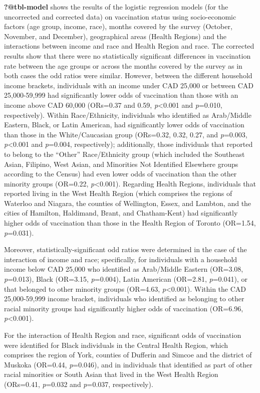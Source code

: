 \documentclass[
  letterpaper,
  DIV=11,
  numbers=noendperiod]{scrartcl}
\begin{document}
\textbf{?@tbl-model} shows the results of the logistic regression models
(for the uncorrected and corrected data) on vaccination status using
socio-economic factors (age group, income, race), months covered by the
survey (October, November, and December), geographical areas (Health
Regions) and the interactions between income and race and Health Region
and race. The corrected results show that there were no statistically
significant differences in vaccination rate between the age groups or
across the months covered by the survey as in both cases the odd ratios
were similar. However, between the different household income brackets,
individuals with an income under CAD 25,000 or between CAD 25,000-59,999
had significantly lower odds of vaccination than those with an income
above CAD 60,000 (ORs=0.37 and 0.59, \emph{p}\textless0.001 and
\emph{p}=0.010, respectively). Within Race/Ethnicity, individuals who
identified as Arab/Middle Eastern, Black, or Latin American, had
significantly lower odds of vaccination than those in the
White/Caucasian group (ORs=0.32, 0.32, 0.27, and \emph{p}=0.003,
\emph{p}\textless0.001 and \emph{p}=0.004, respectively); additionally,
those individuals that reported to belong to the ``Other''
Race/Ethnicity group (which included the Southeast Asian, Filipino, West
Asian, and Minorities Not Identified Elsewhere groups according to the
Census) had even lower odds of vaccination than the other minority
groups (OR=0.22, \emph{p}\textless0.001). Regarding Health Regions,
individuals that reported living in the West Health Region (which
comprises the regions of Waterloo and Niagara, the counties of
Wellington, Essex, and Lambton, and the cities of Hamilton, Haldimand,
Brant, and Chatham-Kent) had significantly higher odds of vaccination
than those in the Health Region of Toronto (OR=1.54, \emph{p}=0.031).

Moreover, statistically-significant odd ratios were determined in the
case of the interaction of income and race; specifically, for
individuals with a household income below CAD 25,000 who identified as
Arab/Middle Eastern (OR=3.08, \emph{p}=0.013), Black (OR=3.15,
\emph{p}=0.004), Latin American (OR=2.81, \emph{p}=0.041), or that
belonged to other minority groups (OR=4.63, \emph{p}\textless0.001).
Within the CAD 25,000-59,999 income bracket, individuals who identified
as belonging to other racial minority groups had significantly higher
odds of vaccination (OR=6.96, \emph{p}\textless0.001).

For the interaction of Health Region and race, significant odds of
vaccination were identified for Black individuals in the Central Health
Region, which comprises the region of York, counties of Dufferin and
Simcoe and the district of Muskoka (OR=0.44, \emph{p}=0.046), and in
individuals that identified as part of other racial minorities or South
Asian that lived in the West Health Region (ORs=0.41, \emph{p}=0.032 and
\emph{p}=0.037, respectively).
\end{document}
